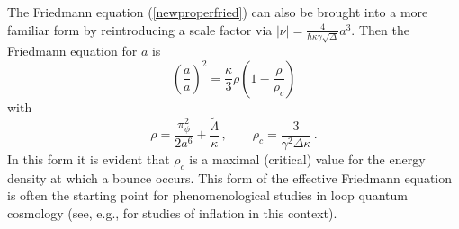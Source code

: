 \documentclass[aps,prd,11pt,showkeys,nofootinbib]{revtex4-2}
\begin{document}
The Friedmann equation (\ref{newproperfried}) can also be brought into a more familiar form by reintroducing a scale factor via $|\nu|=\frac{4}{\hbar \kappa \gamma \sqrt{\Delta}} a^3$. Then the Friedmann equation for $a$ is
\begin{equation}
\left(\frac{\dot{a}}{a}\right)^2 = \frac{\kappa}{3}\rho\left(1-\frac{\rho}{\rho_c}\right)   
\label{standardeffFr}
\end{equation}
with
\begin{equation}
\rho = \frac{\pi_\phi^2}{2a^6}+\frac{\tilde\Lambda}{\kappa}\,,\qquad \rho_c = \frac{3}{\gamma^2\Delta\kappa}\,.
\end{equation}
In this form it is evident that $\rho_c$ is a maximal (critical) value for the energy density at which a bounce occurs. This form of the effective Friedmann equation is often the starting point for phenomenological studies in loop quantum cosmology (see, e.g., \cite{Bhardwaj:2018omt,Paul:2025qtj} for studies of inflation in this context).
\end{document}
